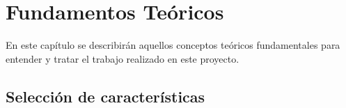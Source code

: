 \chapter{Fundamentos Teóricos}
En este capítulo se describirán aquellos conceptos teóricos fundamentales para entender y tratar el trabajo realizado en este proyecto.

\section{Selección de características}
